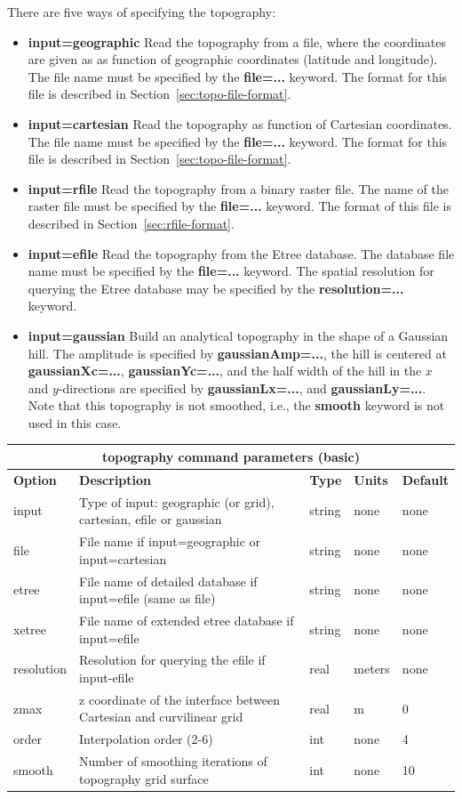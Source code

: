 \documentclass[11pt]{report}
\begin{document}
There are five ways of specifying the topography:
\begin{itemize}
\item {\bf input=geographic} Read the topography from a file, where the coordinates are given as as
  function of geographic coordinates (latitude and longitude). The file name must be specified by
  the {\bf file=...} keyword. The format for this file is described in Section~\ref{sec:topo-file-format}.
\item {\bf input=cartesian} Read the topography as function of Cartesian coordinates. The file name
   must be specified by the {\bf file=...} keyword. The format for this file is described in
   Section~\ref{sec:topo-file-format}.
\item {\bf input=rfile} Read the topography from a binary raster file. The name of the raster file
   must be specified by the {\bf file=...} keyword. The format of this file is described in
   Section~\ref{sec:rfile-format}.
\item {\bf input=efile} Read the topography from the Etree database. The database file name
   must be specified by the {\bf file=...} keyword. The spatial resolution for querying the Etree
  database may be specified by the {\bf resolution=...} keyword.
\item {\bf input=gaussian} Build an analytical topography in the shape of a Gaussian hill. The
  amplitude is specified by {\bf gaussianAmp=...}, the hill is centered at {\bf gaussianXc=...},
  {\bf gaussianYc=...}, and the half width of the hill in the $x$ and $y$-directions are specified by 
   {\bf gaussianLx=...}, and {\bf gaussianLy=...}. Note that this topography is not smoothed, i.e.,
   the {\bf smooth} keyword is not used in this case.
\end{itemize}
%
\begin{center}
\begin{tabular}{|l|p{8cm}|l|l|l|} \hline
\multicolumn{5}{|c|}{\bf topography command parameters (basic)}\\ \hline
\bf{Option} & \bf{Description} & \bf{Type} & \bf{Units} & \bf{Default}\\ \hline \hline
%
input & Type of input: geographic (or grid), cartesian, efile or gaussian & string & none & none\\ \hline
%
file & File name if input=geographic or input=cartesian & string & none & none\\ \hline
%
etree & File name of detailed database if input=efile (same as file) & string & none & none\\ \hline
%
xetree & File name of extended etree database if input=efile & string & none & none\\ \hline
%
resolution & Resolution for querying the efile if input-efile & real & meters & none \\ \hline
%
zmax & z coordinate of the interface between  Cartesian and curvilinear grid& real &  m & 0\\ \hline
%
order & Interpolation order (2-6) & int & none & 4\\ \hline
%
smooth & Number of smoothing iterations of topography grid surface & int & none & 10 \\ \hline
\end{tabular}
\end{center}
\end{document}
